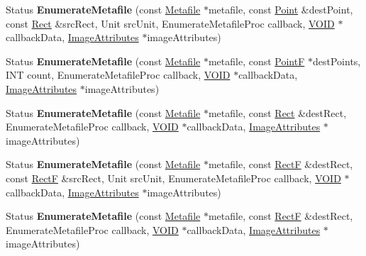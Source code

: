 \begin{DoxyCompactItemize}
Status {\bfseries Enumerate\+Metafile} (const \hyperlink{class_metafile}{Metafile} $\ast$metafile, const \hyperlink{struct_point}{Point} \&dest\+Point, const \hyperlink{struct_rect}{Rect} \&src\+Rect, Unit src\+Unit, Enumerate\+Metafile\+Proc callback, \hyperlink{interfacevoid}{V\+O\+ID} $\ast$callback\+Data, \hyperlink{class_image_attributes}{Image\+Attributes} $\ast$image\+Attributes)
\item 
\mbox{\label{class_graphics_a19386169e28931a7e6ca013ca6dba620}} 
Status {\bfseries Enumerate\+Metafile} (const \hyperlink{class_metafile}{Metafile} $\ast$metafile, const \hyperlink{struct_point_f}{PointF} $\ast$dest\+Points, I\+NT count, Enumerate\+Metafile\+Proc callback, \hyperlink{interfacevoid}{V\+O\+ID} $\ast$callback\+Data, \hyperlink{class_image_attributes}{Image\+Attributes} $\ast$image\+Attributes)
\item 
\mbox{\label{class_graphics_a5ac88adc81dd3f6f82d217c30e6b6546}} 
Status {\bfseries Enumerate\+Metafile} (const \hyperlink{class_metafile}{Metafile} $\ast$metafile, const \hyperlink{struct_rect}{Rect} \&dest\+Rect, Enumerate\+Metafile\+Proc callback, \hyperlink{interfacevoid}{V\+O\+ID} $\ast$callback\+Data, \hyperlink{class_image_attributes}{Image\+Attributes} $\ast$image\+Attributes)
\item 
\mbox{\label{class_graphics_a87ad850049ecd75dbd579aa96e1218a5}} 
Status {\bfseries Enumerate\+Metafile} (const \hyperlink{class_metafile}{Metafile} $\ast$metafile, const \hyperlink{struct_rect_f}{RectF} \&dest\+Rect, const \hyperlink{struct_rect_f}{RectF} \&src\+Rect, Unit src\+Unit, Enumerate\+Metafile\+Proc callback, \hyperlink{interfacevoid}{V\+O\+ID} $\ast$callback\+Data, \hyperlink{class_image_attributes}{Image\+Attributes} $\ast$image\+Attributes)
\item 
\mbox{\label{class_graphics_aa18cdc8781ad5dc18b5c93797a1bc944}} 
Status {\bfseries Enumerate\+Metafile} (const \hyperlink{class_metafile}{Metafile} $\ast$metafile, const \hyperlink{struct_rect_f}{RectF} \&dest\+Rect, Enumerate\+Metafile\+Proc callback, \hyperlink{interfacevoid}{V\+O\+ID} $\ast$callback\+Data, \hyperlink{class_image_attributes}{Image\+Attributes} $\ast$image\+Attributes)
\item 
\mbox{\label{class_graphics_a0ea051e88046afd3a0b5e103b9b7f797}} 

\end{DoxyCompactItemize}
